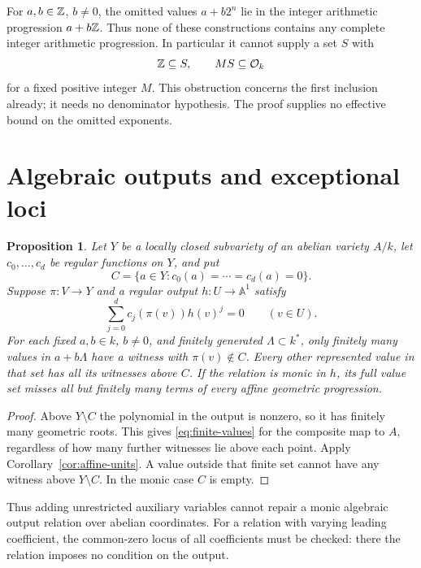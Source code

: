 \documentclass[11pt,a4paper]{article}
\newtheorem{proposition}[theorem]{Proposition}
\theoremstyle{definition}
\newcommand{\A}{\mathbb A}\newcommand{\PP}{\mathbb P}
\begin{document}
For $a,b\in\mathbb Z$, $b\ne0$, the omitted values $a+b2^n$ lie in
the integer arithmetic progression $a+b\mathbb Z$. Thus none of these
constructions contains any complete integer arithmetic progression.
In particular it cannot supply a set $S$ with
\begin{equation}\label{eq:sandwich}
                         \mathbb Z\subseteq S,\qquad MS\subseteq\mathcal O_k
\end{equation}
for a fixed positive integer $M$. This obstruction concerns the
first inclusion already; it needs no denominator hypothesis.
The proof supplies no effective bound on the omitted exponents.

\section{Algebraic outputs and exceptional loci}

\begin{proposition}\label{prop:algebraic-output}
Let $Y$ be a locally closed subvariety of an abelian variety $A/k$,
let $c_0,\ldots,c_d$ be regular functions on $Y$, and put
\[
              C=\{a\in Y:c_0(a)=\cdots=c_d(a)=0\}.
\]
Suppose $\pi:V\to Y$ and a regular output $h:U\to\A^1$ satisfy
\[
                  \sum_{j=0}^{d}c_j(\pi(v))h(v)^j=0
                  \qquad(v\in U).
\]
For each fixed $a,b\in k$, $b\ne0$, and finitely generated
$\Lambda\subset k^*$, only finitely many values in $a+b\Lambda$
have a witness with $\pi(v)\notin C$. Every other represented
value in that set has all its witnesses above $C$.
If the relation is monic in $h$, its full value set misses all
but finitely many terms of every affine geometric progression.
\end{proposition}
\begin{proof}
Above $Y\setminus C$ the polynomial in the output is nonzero,
so it has finitely many geometric roots. This gives
\eqref{eq:finite-values} for the composite map to $A$, regardless
of how many further witnesses lie above each point. Apply
Corollary~\ref{cor:affine-units}. A value outside that finite
set cannot have any witness above $Y\setminus C$. In the monic
case $C$ is empty.
\end{proof}

Thus adding unrestricted auxiliary variables cannot repair a monic
algebraic output relation over abelian coordinates. For a relation
with varying leading coefficient, the common-zero locus of all
coefficients must be checked: there the relation imposes no
condition on the output.
\end{document}
